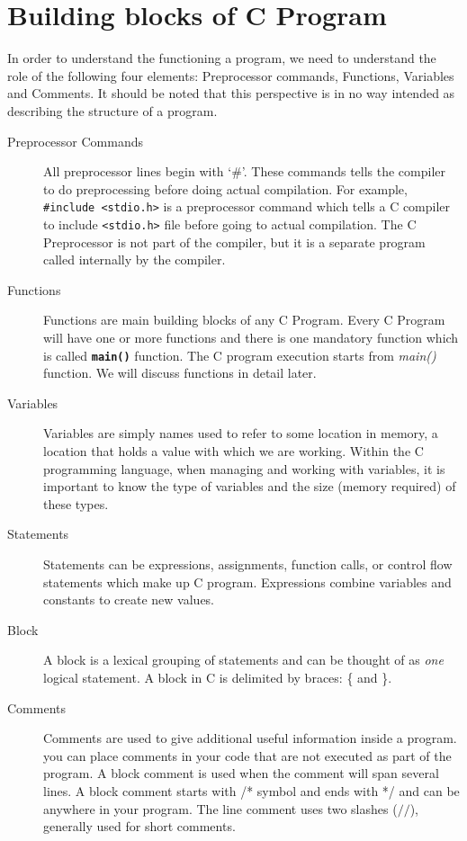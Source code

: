 \documentclass[11pt,a4paper]{article}
\begin{document}
\section*{Building blocks of C Program}
In order to understand the functioning a program, we need to understand the role of the following four elements: Preprocessor commands, Functions, Variables and Comments. It should be noted that this perspective is in no way intended as describing the structure of a program. 
\begin{description}
\item [Preprocessor Commands] All preprocessor lines begin with `\#'. These commands tells the compiler to do preprocessing before doing actual compilation. For example, \texttt{\#include \textless stdio.h\textgreater} is a preprocessor command which tells a C compiler to include \texttt{\textless stdio.h\textgreater} file before going to actual compilation. The C Preprocessor is not part of the compiler, but it is a separate program called internally by the compiler. 
\item [Functions] Functions are main building blocks of any C Program. Every C Program will have one or more functions and there is one mandatory function which is called \textbf{\texttt{main()}} function. The C program execution starts from \emph{main()} function. We will discuss functions in detail later.
\item [Variables] Variables are simply names used to refer to some location in memory, a location that holds a value with which we are working. Within the C programming language, when managing and working with variables, it is important to know the type of variables and the size (memory required) of these types. 
\item [Statements] Statements can be expressions, assignments, function calls, or control flow statements which make up C program. Expressions combine variables and constants to create new values.
\item [Block] A block is a lexical grouping of statements and can be thought of as \emph{one} logical statement. A block in C is delimited by braces: \{ and \}.
\item [Comments] Comments are used to give additional useful information inside a program. you can place comments in your code that are not executed as part of the program. A block comment is used when the comment will span several lines. A block comment starts with /* symbol and ends with */ and can be anywhere in your program. The line comment uses two slashes ($/$$/$), generally used for short comments.
\end{description}
\end{document}
